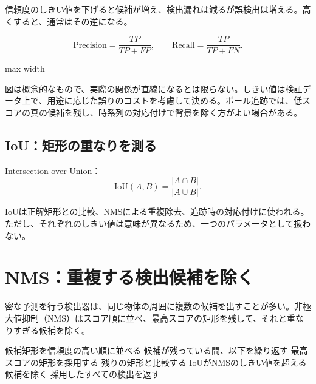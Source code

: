 \documentclass[11pt,a4paper,oneside]{report}
\begin{document}
信頼度のしきい値を下げると候補が増え、検出漏れは減るが誤検出は増える。高くすると、通常はその逆になる。

\[
\mathrm{Precision}=\frac{TP}{TP+FP},
\qquad
\mathrm{Recall}=\frac{TP}{TP+FN}.
\]

\begin{center}
\begin{adjustbox}{max width=\linewidth}
\end{adjustbox}
\end{center}

図は概念的なもので、実際の関係が直線になるとは限らない。しきい値は検証データ上で、用途に応じた誤りのコストを考慮して決める。ボール追跡では、低スコアの真の候補を残し、時系列の対応付けで背景を除く方がよい場合がある。

\subsection{IoU：矩形の重なりを測る}

Intersection over Union：
\[
\mathrm{IoU}(A,B)=\frac{|A\cap B|}{|A\cup B|}.
\]

IoUは正解矩形との比較、NMSによる重複除去、追跡時の対応付けに使われる。ただし、それぞれのしきい値は意味が異なるため、一つのパラメータとして扱わない。

\section{NMS：重複する検出候補を除く}

密な予測を行う検出器は、同じ物体の周囲に複数の候補を出すことが多い。非極大値抑制（NMS）はスコア順に並べ、最高スコアの矩形を残して、それと重なりすぎる候補を除く。

\begin{pseudoBox}
候補矩形を信頼度の高い順に並べる
候補が残っている間、以下を繰り返す
  最高スコアの矩形を採用する
  残りの矩形と比較する
  IoUがNMSのしきい値を超える候補を除く
採用したすべての検出を返す
\end{pseudoBox}
\end{document}
